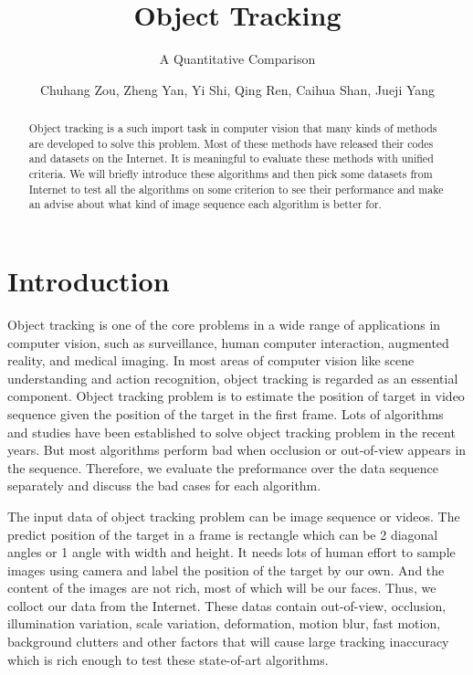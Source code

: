 \documentclass{acm_proc_article-sp}
\begin{document}
\title{Object Tracking}
\subtitle{A Quantitative Comparison}
\author{Chuhang Zou, Zheng Yan, Yi Shi, Qing Ren, Caihua Shan, Jueji Yang}
\maketitle

\begin{abstract}
Object tracking is a such import task in computer vision that many kinds of methods are developed to solve this problem. Most of these methods have released their codes and datasets on the Internet. It is meaningful to evaluate these methods with unified criteria. We will briefly introduce these algorithms and then pick some datasets from Internet to test all the algorithms on some criterion to see their performance and make an advise about what kind of image sequence each algorithm is better for.
\end{abstract}

\section{Introduction}
Object tracking is one of the core problems in a wide range of applications in computer vision, such as surveillance, human computer interaction, augmented reality, and medical imaging.
In most areas of computer vision like scene understanding and action recognition, object tracking is regarded as an essential component.
Object tracking problem is to estimate the position of target in video sequence given the position of the target in the first frame.
Lots of algorithms and studies have been established to solve object tracking problem in the recent years.
But most algorithms perform bad when occlusion or out-of-view appears in the sequence.
Therefore, we evaluate the preformance over the data sequence separately and discuss the bad cases for each algorithm.

The input data of object tracking problem can be image sequence or videos.
The predict position of the target in a frame is rectangle which can be 2 diagonal angles or 1 angle with width and height.
It needs lots of human effort to sample images using camera and label the position of the target by our own.
And the content of the images are not rich, most of which will be our faces.
Thus, we colloct our data from the Internet\cite{dataset}.
These datas contain out-of-view, occlusion, illumination variation, scale variation, deformation, motion blur, fast motion, background clutters and other factors that will cause large tracking inaccuracy which is rich enough to test these state-of-art algorithms.
\end{document}
